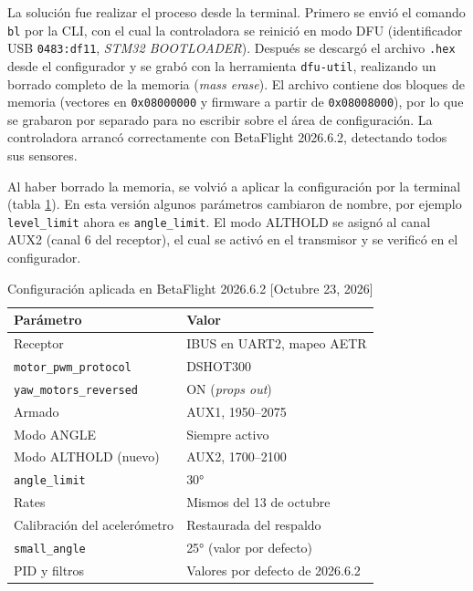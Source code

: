\documentclass[pdflatex,sn-mathphys-num]{sn-jnl}%
\begin{document}
La solución fue realizar el proceso desde la terminal. Primero se envió el comando \texttt{bl} por la CLI, con el cual la controladora se reinició en modo DFU (identificador USB \texttt{0483:df11}, \textit{STM32 BOOTLOADER}). Después se descargó el archivo \texttt{.hex} desde el configurador y se grabó con la herramienta \texttt{dfu-util}, realizando un borrado completo de la memoria (\textit{mass erase}). El archivo contiene dos bloques de memoria (vectores en \texttt{0x08000000} y firmware a partir de \texttt{0x08008000}), por lo que se grabaron por separado para no escribir sobre el área de configuración. La controladora arrancó correctamente con BetaFlight 2026.6.2, detectando todos sus sensores.

Al haber borrado la memoria, se volvió a aplicar la configuración por la terminal (tabla \ref{tab:cambios10-23}). En esta versión algunos parámetros cambiaron de nombre, por ejemplo \texttt{level\_limit} ahora es \texttt{angle\_limit}. El modo ALTHOLD se asignó al canal AUX2 (canal 6 del receptor), el cual se activó en el transmisor y se verificó en el configurador.

\begin{table}[!h]
\centering
\caption{Configuración aplicada en BetaFlight 2026.6.2 [Octubre 23, 2026]}
\label{tab:cambios10-23}
\begin{tabular}{ll}
\hline
Parámetro & Valor \\
\hline
Receptor & IBUS en UART2, mapeo AETR \\
\texttt{motor\_pwm\_protocol} & DSHOT300 \\
\texttt{yaw\_motors\_reversed} & ON (\textit{props out}) \\
Armado & AUX1, 1950--2075 \\
Modo ANGLE & Siempre activo \\
Modo ALTHOLD (nuevo) & AUX2, 1700--2100 \\
\texttt{angle\_limit} & 30° \\
Rates & Mismos del 13 de octubre \\
Calibración del acelerómetro & Restaurada del respaldo \\
\texttt{small\_angle} & 25° (valor por defecto) \\
PID y filtros & Valores por defecto de 2026.6.2 \\
\hline
\end{tabular}
\end{table}
\end{document}
